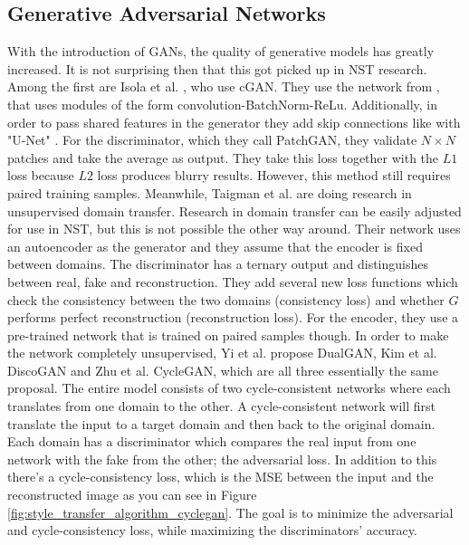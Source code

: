 \subsection{Generative Adversarial Networks}
With the introduction of \glspl{GAN}, the quality of generative models has greatly increased.
It is not surprising then that this got picked up in \gls{NST} research.
Among the first are Isola et al. \cite{Isola2016}, who use \gls{cGAN}.
They use the network from \cite{radford2016}, that uses modules of the form convolution-BatchNorm-ReLu\cite{Ioffe2015}.
Additionally, in order to pass shared features in the generator they add skip connections like with "U-Net" \cite{Ronneberger2015}.
For the discriminator, which they call PatchGAN, they validate $N\times N$ patches and take the average as output.
They take this loss together with the $L1$ loss because $L2$ loss produces blurry results.
However, this method still requires paired training samples.
Meanwhile, Taigman et al. \cite{Taigman2016} are doing research in unsupervised domain transfer.
Research in domain transfer can be easily adjusted for use in \gls{NST}, but this is not possible the other way around.
Their network uses an autoencoder as the generator and they assume that the encoder is fixed between domains.
The discriminator has a ternary output and distinguishes between real, fake and reconstruction.
They add several new loss functions which check the consistency between the two domains (consistency loss) and whether $G$ performs perfect reconstruction (reconstruction loss).
For the encoder, they use a pre-trained network that is trained on paired samples though.
In order to make the network completely unsupervised, Yi et al.\cite{Yi2017} propose DualGAN, Kim et al. \cite{Kim2017} DiscoGAN and Zhu et al. \cite{Zhu2017b} CycleGAN, which are all three essentially the same proposal.
The entire model consists of two cycle-consistent networks where each translates from one domain to the other.
A cycle-consistent network will first translate the input to a target domain and then back to the original domain.
Each domain has a discriminator which compares the real input from one network with the fake from the other; the adversarial loss.
In addition to this there's a cycle-consistency loss, which is the \gls{MSE} between the input and the reconstructed image as you can see in Figure \ref{fig:style_transfer_algorithm_cyclegan}.
The goal is to minimize the adversarial and cycle-consistency loss, while maximizing the discriminators' accuracy.

\begin{figure}[h]
	\centering
\end{figure}

